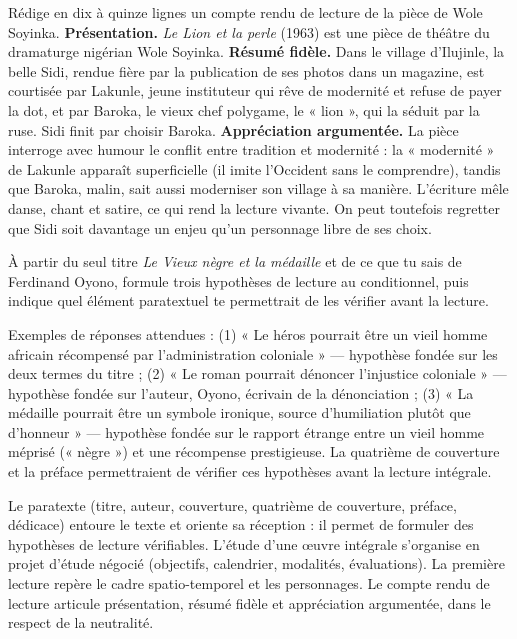 \documentclass[11pt]{article}
\newcommand{\cle}[1]{{\popxbold\color{popdark}#1}}
\begin{document}
\begin{exoresolu}
Rédige en dix à quinze lignes un compte rendu de lecture de la pièce de Wole Soyinka.
\tcblower
\textbf{Présentation.} \emph{Le Lion et la perle} (1963) est une pièce de théâtre du dramaturge nigérian Wole Soyinka. \textbf{Résumé fidèle.} Dans le village d'Ilujinle, la belle Sidi, rendue fière par la publication de ses photos dans un magazine, est courtisée par Lakunle, jeune instituteur qui rêve de modernité et refuse de payer la dot, et par Baroka, le vieux chef polygame, le « lion », qui la séduit par la ruse. Sidi finit par choisir Baroka. \textbf{Appréciation argumentée.} La pièce interroge avec humour le conflit entre tradition et modernité : la « modernité » de Lakunle apparaît superficielle (il imite l'Occident sans le comprendre), tandis que Baroka, malin, sait aussi moderniser son village à sa manière. L'écriture mêle danse, chant et satire, ce qui rend la lecture vivante. On peut toutefois regretter que Sidi soit davantage un enjeu qu'un personnage libre de ses choix.
\end{exoresolu}

\begin{exercice}
À partir du seul titre \emph{Le Vieux nègre et la médaille} et de ce que tu sais de Ferdinand Oyono, formule trois hypothèses de lecture au conditionnel, puis indique quel élément paratextuel te permettrait de les vérifier avant la lecture.
\end{exercice}

\begin{corrige}
Exemples de réponses attendues : (1) « Le héros pourrait être un vieil homme africain récompensé par l'administration coloniale » — hypothèse fondée sur les deux termes du titre ; (2) « Le roman pourrait dénoncer l'injustice coloniale » — hypothèse fondée sur l'auteur, Oyono, écrivain de la dénonciation ; (3) « La médaille pourrait être un symbole ironique, source d'humiliation plutôt que d'honneur » — hypothèse fondée sur le rapport étrange entre un vieil homme méprisé (« nègre ») et une récompense prestigieuse. La quatrième de couverture et la préface permettraient de vérifier ces hypothèses avant la lecture intégrale.
\end{corrige}

\begin{aretenir}
Le \cle{paratexte} (titre, auteur, couverture, quatrième de couverture, préface, dédicace) entoure le texte et oriente sa réception : il permet de formuler des \cle{hypothèses de lecture} vérifiables. L'étude d'une œuvre intégrale s'organise en \cle{projet d'étude négocié} (objectifs, calendrier, modalités, évaluations). La première lecture repère le \cle{cadre spatio-temporel} et les personnages. Le \cle{compte rendu de lecture} articule présentation, résumé fidèle et appréciation argumentée, dans le respect de la neutralité.
\end{aretenir}
\end{document}
